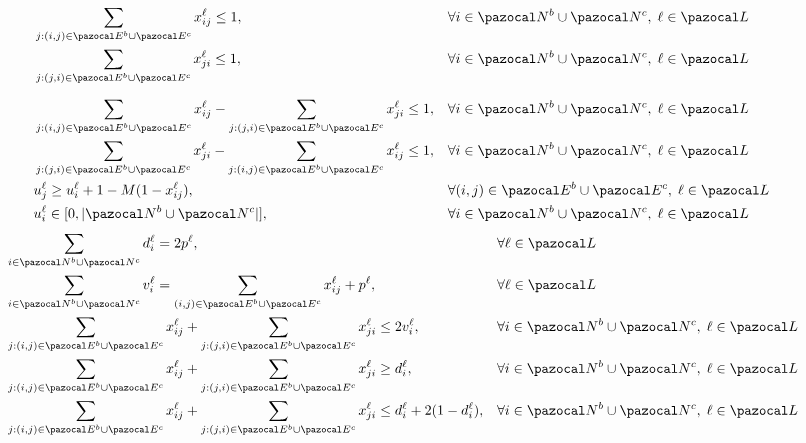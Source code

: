 \documentclass[3p,times,procedia]{elsarticle}
\begin{document}
\begin{align}
& \sum_{j:(i,j) \in \pazocal E^b \cup \pazocal E^c} x_{ij}^\ell \leq 1, 
&& \forall i \in \pazocal N^b \cup \pazocal N^c,\; \ell \in \pazocal L 
\label{eq:lc1} \\
& \sum_{j:(j,i) \in \pazocal E^b \cup \pazocal E^c} x_{ji}^\ell \leq 1, 
&& \forall i \in \pazocal N^b \cup \pazocal N^c,\; \ell \in \pazocal L 
\label{eq:lc2} \\[6pt]
& \sum_{j:(i,j) \in \pazocal E^b \cup \pazocal E^c} x_{ij}^\ell 
   - \sum_{j:(j,i) \in \pazocal E^b \cup \pazocal E^c} x_{ji}^\ell \leq 1, 
&& \forall i \in \pazocal N^b \cup \pazocal N^c,\; \ell \in \pazocal L 
\label{eq:lc3} \\
& \sum_{j:(j,i) \in \pazocal E^b \cup \pazocal E^c} x_{ji}^\ell 
   - \sum_{j:(i,j) \in \pazocal E^b \cup \pazocal E^c} x_{ij}^\ell \leq 1, 
&& \forall i \in \pazocal N^b \cup \pazocal N^c,\; \ell \in \pazocal L 
\label{eq:lc4}\\
& u_{j}^\ell \geq u_{i}^\ell + 1 - M(1 - x_{ij}^\ell), 
&& \forall (i,j) \in \pazocal E^b \cup \pazocal E^c,\; \ell \in \pazocal L 
\label{eq:lc5} \\
& u_{i}^\ell \in [0, |\pazocal N^b \cup \pazocal N^c|], 
&& \forall i \in \pazocal N^b \cup \pazocal N^c,\; \ell \in \pazocal L 
\label{eq:lc6}
\end{align}
%
\begin{align}
& \sum_{i \in \pazocal N^b \cup \pazocal N^c} d_{i}^\ell = 2p^\ell, 
&& \forall \ell \in \pazocal L 
\label{eq:lc7} \\
& \sum_{i \in \pazocal N^b \cup \pazocal N^c} v_{i}^\ell 
   = \sum_{(i,j) \in \pazocal E^b \cup \pazocal E^c} x_{ij}^\ell + p^\ell, 
&& \forall \ell \in \pazocal L 
\label{eq:lc8} \\
& \sum_{j:(i,j) \in \pazocal E^b \cup \pazocal E^c} x_{ij}^\ell 
   + \sum_{j:(j,i) \in \pazocal E^b \cup \pazocal E^c} x_{ji}^\ell \leq 2v_i^\ell, 
&& \forall i \in \pazocal N^b \cup \pazocal N^c,\; \ell \in \pazocal L 
\label{eq:lc9} \\
& \sum_{j:(i,j) \in \pazocal E^b \cup \pazocal E^c} x_{ij}^\ell 
   + \sum_{j:(j,i) \in \pazocal E^b \cup \pazocal E^c} x_{ji}^\ell \geq d_i^\ell, 
&& \forall i \in \pazocal N^b \cup \pazocal N^c,\; \ell \in \pazocal L 
\label{eq:lc10a} \\
& \sum_{j:(i,j) \in \pazocal E^b \cup \pazocal E^c} x_{ij}^\ell 
   + \sum_{j:(j,i) \in \pazocal E^b \cup \pazocal E^c} x_{ji}^\ell 
   \leq d_i^\ell + 2(1-d_i^\ell), 
&& \forall i \in \pazocal N^b \cup \pazocal N^c,\; \ell \in \pazocal L 
\label{eq:lc10b}
\end{align}
\end{document}
